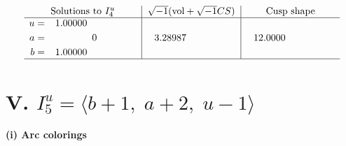\documentclass[1p]{elsarticle_modified}
\theoremstyle{definition}
\newcommand{\I}{\sqrt{-1}}
\begin{document}
$$\begin{array}{c|c|c}  
\text{Solutions to }I^u_{4}& \I (\text{vol} + \sqrt{-1}CS) & \text{Cusp shape}\\
 \hline 
\begin{aligned}
u &= \phantom{-}1.00000\phantom{ +0.000000I} \\
a &= \phantom{-0.000000 } 0 \\
b &= \phantom{-}1.00000\phantom{ +0.000000I}\end{aligned}
 & \phantom{-}3.28987\phantom{ +0.000000I} & \phantom{-}12.0000\phantom{ +0.000000I}\\
 \hline 
 \end{array}$$\newpage\newpage\renewcommand{\arraystretch}{1}
\centering \section*{V. $I^u_{5}= \langle b+1,\;a+2,\;u-1 \rangle$}
\flushleft \textbf{(i) Arc colorings}\\
\end{document}
